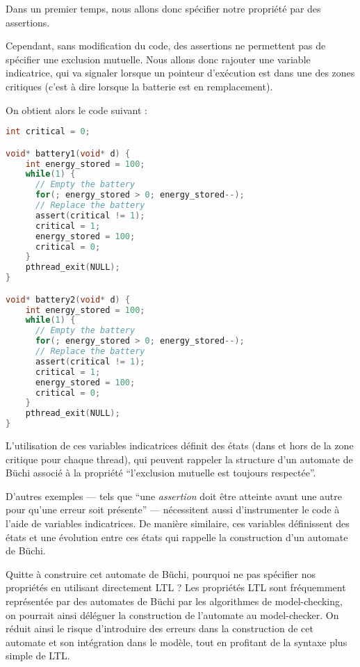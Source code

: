Dans un premier temps, nous allons donc spécifier notre propriété par
des assertions.

Cependant, sans modification du code, des assertions ne permettent pas
de spécifier une exclusion mutuelle. Nous allons donc rajouter une
variable indicatrice, qui va signaler lorsque un pointeur d'exécution
est dans une des zones critiques (c'est à dire lorsque la batterie est
en remplacement).

On obtient alors le code suivant :

\begin{lstlisting}[language=C]
int critical = 0;

void* battery1(void* d) {
    int energy_stored = 100;
    while(1) {
      // Empty the battery
      for(; energy_stored > 0; energy_stored--);
      // Replace the battery
      assert(critical != 1);
      critical = 1;
      energy_stored = 100;
      critical = 0;
    }
    pthread_exit(NULL);
}

void* battery2(void* d) {
    int energy_stored = 100;
    while(1) {
      // Empty the battery
      for(; energy_stored > 0; energy_stored--);
      // Replace the battery
      assert(critical != 1);
      critical = 1;
      energy_stored = 100;
      critical = 0;
    }
    pthread_exit(NULL);
}
\end{lstlisting}


L'utilisation de ces variables indicatrices définit des états (dans et
hors de la zone critique pour chaque thread), qui peuvent rappeler la
structure d'un automate de Büchi associé à la propriété ``l'exclusion
mutuelle est toujours respectée''.

D'autres exemples --- tels que ``une \emph{assertion} doit être atteinte
avant une autre pour qu'une erreur soit présente'' --- nécessitent aussi
d'instrumenter le code à l'aide de variables indicatrices. De manière
similaire, ces variables définissent des états et une évolution entre
ces états qui rappelle la construction d'un automate de Büchi.

Quitte à construire cet automate de Büchi, pourquoi ne pas spécifier nos
propriétés en utilisant directement LTL ? Les propriétés LTL sont fréquemment
représentée par des automates de Büchi par les algorithmes de model-checking, on
pourrait ainsi déléguer la construction de l'automate au model-checker.
On réduit ainsi le risque d'introduire des erreurs dans la construction de cet
automate et son intégration dans le modèle, tout en profitant de la syntaxe plus
simple de LTL.

